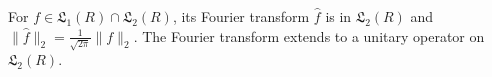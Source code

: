 For $f \in \mathfrak{L}_1(R) \cap \mathfrak{L}_2(R)$, its Fourier transform $\hat{f}$ is in $\mathfrak{L}_2(R)$ and $\|\hat{f}\|_2 = \frac{1}{\sqrt{2\pi}} \|f\|_2$. The Fourier transform extends to a unitary operator on $\mathfrak{L}_2(R)$.
